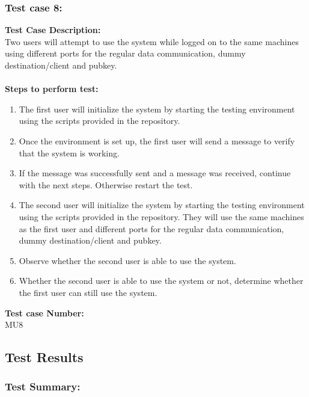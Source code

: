 \documentclass{article}
\begin{document}
\subsubsection{Test case 8: }
\textbf{Test Case Description:\\} Two users will attempt to use the system while logged on to the same machines using different ports for the regular data communication, dummy destination/client and pubkey.\\\\
\textbf{Steps to perform test: } 
\begin{enumerate}
    \item The first user will initialize the system by starting the testing environment using the scripts provided in the repository.
    \item Once the environment is set up, the first user will send a message to verify that the system is working.
    \item If the message was successfully sent and a message was received, continue with the next steps. Otherwise restart the test.
    \item The second user will initialize the system by starting the testing environment using the scripts provided in the repository. They will use the same machines as the first user and different ports for the regular data communication, dummy destination/client and pubkey.
    \item Observe whether the second user is able to use the system.
    \item Whether the second user is able to use the system or not, determine whether the first user can still use the system.
\end{enumerate}
\textbf{Test case Number: \\} MU8

\subsection{Test Results}

\subsubsection{Test Summary:}
\end{document}
